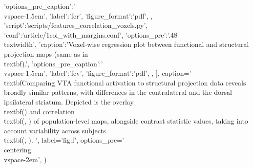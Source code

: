 \begin{sansmath}
{{                        'options_pre_caption':'\\vspace{-1.5em}',
                        'label':'fcr',
                        'figure_format':'pdf',
                        },
                {'script':'scripts/features_correlation_voxels.py', 'conf':'article/1col_with_margins.conf', 'options_pre':'{.48\\textwidth}',
                        'caption':'Voxel-wise regression plot between functional and structural projection maps (same as in \\textbf{}).',
                        'options_pre_caption':'\\vspace{-1.5em}',
                        'label':'fcv',
                        'figure_format':'pdf',
                        },
                ],
        caption='
                \\textbf{Comparing VTA functional activation to structural projection data reveals broadly similar patterns, with differences in the contralateral and the dorsal ipsilateral striatum.}
                Depicted is the overlay \\textbf{()} and correlation \\textbf{(, )} of population-level maps, alongside contrast statistic values, taking into account variability across subjects \\textbf{(, )}.
                ',
        label='fig:f',
        options_pre='\\centering\n\\vspace{-2em}',
        )}
\end{sansmath}
